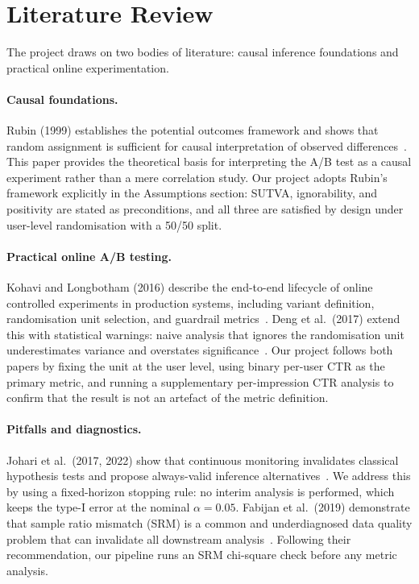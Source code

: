 \documentclass[a4paper,12pt]{extarticle}
\numberwithin{equation}{section}
\begin{document}
\clearpage

\section{Literature Review}

The project draws on two bodies of literature: causal inference foundations
and practical online experimentation.

\paragraph{Causal foundations.}
Rubin (1999) establishes the potential outcomes framework and shows that
random assignment is sufficient for causal interpretation of observed
differences~\cite{rubin1999teaching}. This paper provides the theoretical
basis for interpreting the A/B test as a causal experiment rather than a
mere correlation study. Our project adopts Rubin's framework explicitly
in the Assumptions section: SUTVA, ignorability, and positivity are stated
as preconditions, and all three are satisfied by design under user-level
randomisation with a 50/50 split.

\paragraph{Practical online A/B testing.}
Kohavi and Longbotham (2016) describe the end-to-end lifecycle of
online controlled experiments in production systems, including variant
definition, randomisation unit selection, and guardrail
metrics~\cite{kohavi2016online}. Deng et al.\ (2017) extend this with
statistical warnings: naive analysis that ignores the randomisation unit
underestimates variance and overstates significance~\cite{deng2017trustworthy}.
Our project follows both papers by fixing the unit at the user level, using
binary per-user CTR as the primary metric, and running a supplementary
per-impression CTR analysis to confirm that the result is not an artefact
of the metric definition.

\paragraph{Pitfalls and diagnostics.}
Johari et al.\ (2017, 2022) show that continuous monitoring invalidates
classical hypothesis tests and propose always-valid inference
alternatives~\cite{johari2017peeking,johari2022always}. We address this by
using a fixed-horizon stopping rule: no interim analysis is performed, which
keeps the type-I error at the nominal $\alpha = 0.05$. Fabijan et al.\ (2019)
demonstrate that sample ratio mismatch (SRM) is a common and underdiagnosed
data quality problem that can invalidate all downstream
analysis~\cite{fabijan2019srm}. Following their recommendation, our pipeline
runs an SRM chi-square check before any metric analysis.
\end{document}
